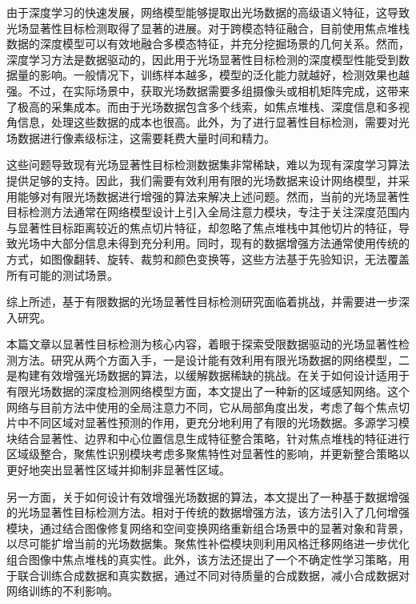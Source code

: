 由于深度学习的快速发展，网络模型能够提取出光场数据的高级语义特征，这导致光场显著性目标检测取得了显著的进展。对于跨模态特征融合，目前使用焦点堆栈数据的深度模型可以有效地融合多模态特征，并充分挖掘场景的几何关系。然而，深度学习方法是数据驱动的，因此用于光场显著性目标检测的深度模型性能受到数据量的影响。一般情况下，训练样本越多，模型的泛化能力就越好，检测效果也越强。不过，在实际场景中，获取光场数据需要多组摄像头或相机矩阵完成，这带来了极高的采集成本。而由于光场数据包含多个线索，如焦点堆栈、深度信息和多视角信息，处理这些数据的成本也很高。此外，为了进行显著性目标检测，需要对光场数据进行像素级标注，这需要耗费大量时间和精力。

这些问题导致现有光场显著性目标检测数据集非常稀缺，难以为现有深度学习算法提供足够的支持。因此，我们需要有效利用有限的光场数据来设计网络模型，并采用能够对有限光场数据进行增强的算法来解决上述问题。然而，当前的光场显著性目标检测方法通常在网络模型设计上引入全局注意力模块，专注于关注深度范围内与显著性目标距离较近的焦点切片特征，却忽略了焦点堆栈中其他切片的特征，导致光场中大部分信息未得到充分利用。同时，现有的数据增强方法通常使用传统的方式，如图像翻转、旋转、裁剪和颜色变换等，这些方法基于先验知识，无法覆盖所有可能的测试场景。

综上所述，基于有限数据的光场显著性目标检测研究面临着挑战，并需要进一步深入研究。



本篇文章以显著性目标检测为核心内容，着眼于探索受限数据驱动的光场显著性检测方法。研究从两个方面入手，一是设计能有效利用有限光场数据的网络模型，二是构建有效增强光场数据的算法，以缓解数据稀缺的挑战。在关于如何设计适用于有限光场数据的深度检测网络模型方面，本文提出了一种新的区域感知网络。这个网络与目前方法中使用的全局注意力不同，它从局部角度出发，考虑了每个焦点切片中不同区域对显著性预测的作用，更充分地利用了有限的光场数据。多源学习模块结合显著性、边界和中心位置信息生成特征整合策略，针对焦点堆栈的特征进行区域级整合，聚焦性识别模块考虑多聚焦特性对显著性的影响，并更新整合策略以更好地突出显著性区域并抑制非显著性区域。

另一方面，关于如何设计有效增强光场数据的算法，本文提出了一种基于数据增强的光场显著性目标检测方法。相对于传统的数据增强方法，该方法引入了几何增强模块，通过结合图像修复网络和空间变换网络重新组合场景中的显著对象和背景，以尽可能扩增当前的光场数据集。聚焦性补偿模块则利用风格迁移网络进一步优化组合图像中焦点堆栈的真实性。此外，该方法还提出了一个不确定性学习策略，用于联合训练合成数据和真实数据，通过不同对待质量的合成数据，减小合成数据对网络训练的不利影响。

